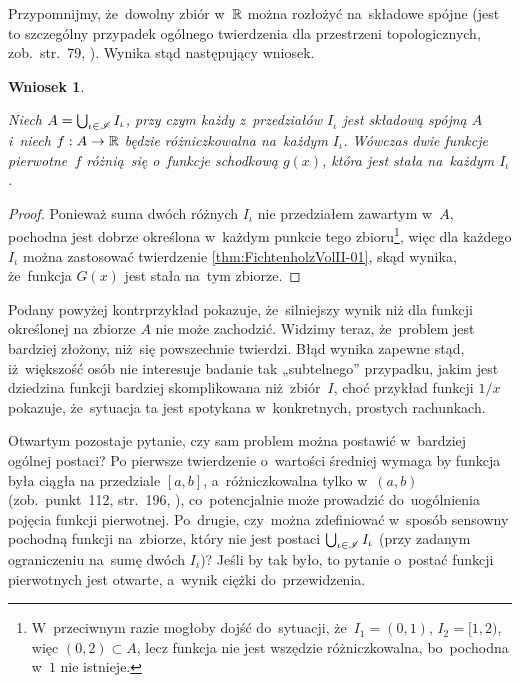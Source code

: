 \documentclass[a4paper,11pt]{article}
\newtheorem{corollary}{Wniosek}
\begin{document}
Przypomnijmy, że~dowolny zbiór w~$\mathbb{R}$ można rozłożyć na~składowe
spójne (jest to szczególny przypadek ogólnego twierdzenia dla
przestrzeni topologicznych, zob.~str.~79,
\cite{SchwartzKursAnalizyMatematycznejVolI1979}). Wynika stąd
następujący wniosek.





\begin{corollary}
  \label{cor:FichtenholzVolII-01}

  Niech $A = \bigcup_{ \iota \in \mathcal{I} } I_{ \iota }$, przy czym każdy
  z~przedziałów
  $I_{ \iota }$ jest składową spójną $A$ i~niech $f: A \to \mathbb{R}$
  będzie różniczkowalna na~każdym $I_{ \iota }$. Wówczas dwie funkcje
  pierwotne~$f$ różnią~się o~funkcje schodkową $g( x )$, która jest
  stała na~każdym $I_{ \iota }$.

\end{corollary}



\begin{proof}

  Ponieważ suma dwóch różnych $I_{ \iota }$ nie przedziałem zawartym
  w~$A$, pochodna jest dobrze określona w~każdym punkcie tego
  zbioru\footnote{W~przeciwnym razie mogłoby dojść do~sytuacji,
    że~$I_{ 1 } = (0, 1)$, $I_{ 2 } = [ 1, 2 )$, więc
    $( 0, 2 ) \subset A$, lecz funkcja nie jest wszędzie
    różniczkowalna, bo~pochodna w~$1$ nie istnieje.}, więc dla każdego
  $I_{ \iota }$ można zastosować twierdzenie
  \ref{thm:FichtenholzVolII-01}, skąd wynika, że~funkcja $G( x )$ jest
  stała na~tym zbiorze.

\end{proof}





Podany powyżej kontrprzykład pokazuje, że~silniejszy wynik niż dla
funkcji określonej na zbiorze $A$ nie może zachodzić. Widzimy teraz,
że~problem jest bardziej złożony, niż~się powszechnie twierdzi. Błąd
wynika zapewne stąd, iż~większość osób nie interesuje badanie tak
„subtelnego” przypadku, jakim jest dziedzina funkcji bardziej
skomplikowana niż~zbiór~$I$, choć przykład funkcji $1 / x$ pokazuje,
że~sytuacja ta jest spotykana w~konkretnych, prostych rachunkach.

Otwartym pozostaje pytanie, czy sam problem można postawić w~bardziej
ogólnej postaci? Po pierwsze twierdzenie o~wartości średniej wymaga by
funkcja była ciągła na przedziale $[ a, b ]$, a~różniczkowalna tylko
w~$( a, b )$ (zob.~punkt~112, str.~196,
\cite{FichtenholzRachunekRozniczkowyETCVolI2005}), co~potencjalnie
może prowadzić do~uogólnienia pojęcia funkcji pierwotnej. Po~drugie,
czy~można zdefiniować w~sposób sensowny pochodną funkcji na~zbiorze,
który nie jest postaci $\bigcup_{ \iota \in \mathcal{I} } I_{ \iota }$ (przy
zadanym ograniczeniu na~sumę dwóch $I_{ \iota }$)? Jeśli by tak było,
to pytanie o~postać funkcji pierwotnych jest otwarte, a~wynik ciężki
do~przewidzenia.
\end{document}
